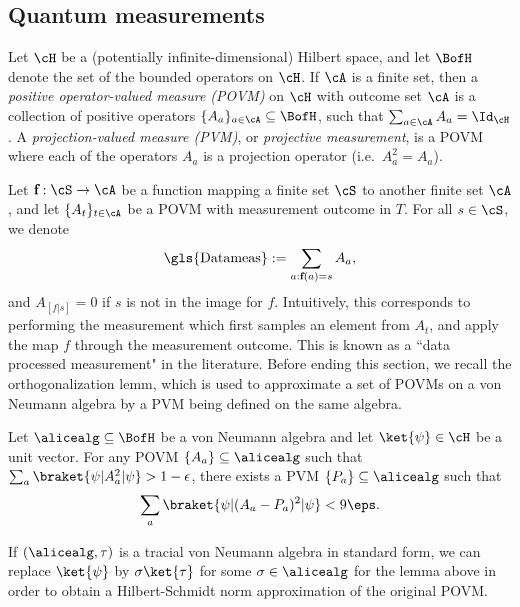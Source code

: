 \subsection{Quantum measurements}

Let $\cH$ be a (potentially infinite-dimensional) Hilbert space, and let $\BofH$ denote the set of the bounded operators on $\cH$. If $\cA$ is a finite set, then a \textit{positive operator-valued measure (POVM)} on $\cH$ with outcome set $\cA$ is a collection of positive operators $\{ A_a \}_{a \in \cA} \subseteq \BofH$, such that $\sum_{a \in \cA} A_a = \Id_{\cH}$. A \textit{projection-valued measure (PVM)}, or \textit{projective measurement}, is a POVM where each of the operators $A_a$ is a projection operator (i.e.~$A_a^2 = A_a$). 



Let $\textbf{f}: \cS \rightarrow \cA$ be a function mapping a finite set $\cS$ to another finite set $\cA$, and let $\{A_t\}_{t \in \cA}$ be a POVM with measurement outcome in $T$. For all $s \in \cS$, we denote
\begin{equation}\label{eq:dataprocessmeasdef}
	\text{\gls{Datameas}} := \sum_{a: \textbf{f}(a) = s} A_a,
\end{equation}
and $A_{[f|s]} = 0$ if $s$ is not in the image for $f$. Intuitively, this corresponds to performing the measurement which first samples an element from $A_t$, and apply the map  $f$ through the measurement outcome. This is known as a ``data processed measurement" in the literature. Before ending this section, we recall the orthogonalization lemm, which is used to approximate a set of POVMs on a von Neumann algebra by a PVM being defined on the same algebra. 

\begin{lemma} \label{lem:orthogonalizationlemma}
	Let $\alicealg \subseteq \BofH$ be a von Neumann algebra and let $\ket{\psi} \in \cH$ be a unit vector. For any POVM $\{ A_a \} \subseteq \alicealg$ such that $\sum_a \braket{\psi|A_a^2|\psi} >1-  \epsilon$, there exists a PVM $\{P_a\} \subseteq \alicealg$ such that
	\begin{equation*}
		\sum_{a} \braket{\psi| (A_a - P_a)^2 |\psi}< 9 \eps.
	\end{equation*}
\end{lemma} 
If $(\alicealg, \tau)$ is a tracial von Neumann algebra in standard form, we can replace $\ket{\psi}$ by $\sigma \ket{\tau}$ for some $\sigma \in \alicealg$ for the lemma above in order to obtain a Hilbert-Schmidt norm approximation of the original POVM. 

